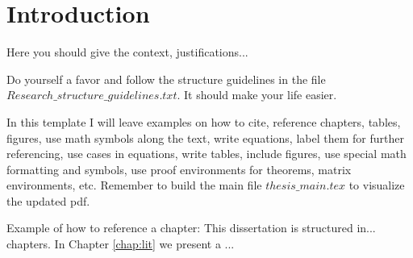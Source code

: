 \chapter{Introduction} \label{chap:intro}
\pagestyle{fancyplain}


Here you should give the context, justifications...

Do yourself a favor and follow the structure guidelines in the file $Research\_structure\_guidelines.txt$.
It should make your life easier.

In this template I will leave examples on how to cite, reference chapters, tables, figures, use math symbols along the text, write equations, label them for further referencing, use cases in equations, write tables, include figures, use special math formatting and symbols, use proof environments for theorems, matrix environments, etc.
Remember to build the main file $thesis\_main.tex$ to visualize the updated pdf.


Example of how to reference a chapter:
This dissertation is structured in... chapters.
In Chapter \ref{chap:lit} we present a ...
